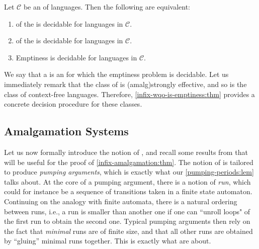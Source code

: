 \begin{theorem}[restated=infix-wqo-is-emptiness:thm,label=infix-wqo-is-emptiness:thm]
	Let $\mathcal{C}$ be an  of languages.
    Then the following are equivalent:
	\begin{enumerate}
        \item\label{wqo-infix-decidable}  of the  is decidable for languages in $\mathcal{C}$.
        \item\label{wqo-prefix-decidable}  of the  is decidable for languages in $\mathcal{C}$.
        \item\label{emptiness-decidable} Emptiness is decidable for languages in $\mathcal{C}$.
	\end{enumerate}
\end{theorem}

\AP We say that a  is an
 for which the emptiness problem is decidable.
Let us immediately remark that the class of  is
\kl(amalg){strongly effective}, and so is the class of context-free languages.
Therefore, \cref{infix-wqo-is-emptiness:thm} provides a concrete decision
procedure for these classes.

\subsection{Amalgamation Systems}
\label{amalgamation-systems:subsec}

Let us now formally introduce the notion of , and
recall some results from \cite{ASZZ24} that will be useful for the proof of
\cref{infix-amalgamation:thm}. The notion of  is
tailored to produce \emph{pumping arguments}, which is exactly what our
\cref{pumping-periods:lem} talks about. At the core of a pumping argument,
there is a notion of \emph{run}, which could for instance be a sequence of
transitions taken in a finite state automaton. Continuing on the analogy with
finite automata, there is a natural ordering between runs, i.e., a run is
smaller than another one if one can ``unroll loops" of the first run to obtain
the second one. Typical pumping arguments then rely on the fact that
\emph{minimal} runs are of finite size, and that all other runs are
obtained by ``gluing'' minimal runs together. This is exactly what
 are about.

